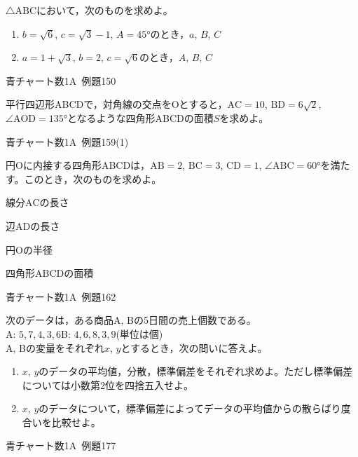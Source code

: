\documentclass[b4paper, dvipdfmx, 11pt, fleqn, twocolumn, uplatex]{jsarticle}
\newenvironment{tabbedenum}[1]
{\NumTabs{#1}\begin{enumerate*}[label={(\arabic*)},itemjoin={\tab}]}{\end{enumerate*}}
\begin{document}

\begin{screen}
$\triangle{\mathrm{ABC}}$において，次のものを求めよ。
\begin{enumerate}[label={(\arabic*)}]
\item $b=\sqrt{6}$, $c=\sqrt{3}-1$, $A=\ang{45}$のとき，$a$, $B$, $C$
\item $a=1+\sqrt3$, $b=2$, $c=\sqrt6$のとき，$A$, $B$, $C$
\end{enumerate}
\begin{flushright}
    青チャート数1A~例題150
\end{flushright}
\end{screen}


\begin{screen}
平行四辺形ABCDで，対角線の交点を$\mathrm{O}$とすると，$\mathrm{AC}=10$, $\mathrm{BD}=6\sqrt2$, $\angle{\mathrm{AOD}}=\ang{135}$となるような四角形ABCDの面積$S$を求めよ。
\begin{flushright}
    青チャート数1A~例題159(1)
\end{flushright}
\end{screen}


\begin{screen}
円$\mathrm{O}$に内接する四角形ABCDは，$\mathrm{AB}=2$, $\mathrm{BC}=3$, $\mathrm{CD}=1$, $\angle{\mathrm{ABC}}=\ang{60}$を満たす。このとき，次のものを求めよ。\\
\begin{tabbedenum}{2}
	\item 線分$\mathrm{AC}$の長さ
	\item 辺$\mathrm{AD}$の長さ
	\item 円$\mathrm{O}$の半径
	\item 四角形ABCDの面積
\end{tabbedenum}
\begin{flushright}
    青チャート数1A~例題162
\end{flushright}
\end{screen}




\begin{screen}
次のデータは，ある商品A, Bの5日間の売上個数である。\\
A: $5, 7, 4, 3, 6$\quad B: $4, 6, 8, 3, 9$\quad(単位は個)\\
A, Bの変量をそれぞれ$x$, $y$とするとき，次の問いに答えよ。
\begin{enumerate}[label={(\arabic*)}]
\item $x$, $y$のデータの平均値，分散，標準偏差をそれぞれ求めよ。ただし標準偏差については小数第2位を四捨五入せよ。
\item $x$, $y$のデータについて，標準偏差によってデータの平均値からの散らばり度合いを比較せよ。
\end{enumerate}
\begin{flushright}
    青チャート数1A~例題177
\end{flushright}
\end{screen}
\end{document}
